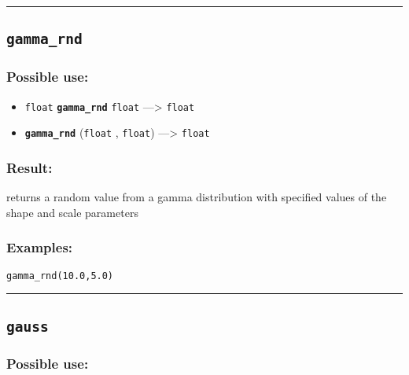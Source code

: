\documentclass[]{book}
\providecommand{\tightlist}{%
  \setlength{\itemsep}{0pt}\setlength{\parskip}{0pt}}
\theoremstyle{definition}
\theoremstyle{definition}
\theoremstyle{definition}
\theoremstyle{remark}
\begin{document}
\begin{center}\rule{0.5\linewidth}{\linethickness}\end{center}

\subsection{\texorpdfstring{\texttt{gamma\_rnd}}{gamma\_rnd}}\label{gamma_rnd}

\subsubsection{Possible use:}\label{possible-use-184}

\begin{itemize}
\tightlist
\item
  \texttt{float} \textbf{\texttt{gamma\_rnd}} \texttt{float}
  ---\textgreater{} \texttt{float}
\item
  \textbf{\texttt{gamma\_rnd}} (\texttt{float} , \texttt{float})
  ---\textgreater{} \texttt{float}
\end{itemize}

\subsubsection{Result:}\label{result-178}

returns a random value from a gamma distribution with specified values
of the shape and scale parameters

\subsubsection{Examples:}\label{examples-134}

\begin{verbatim}
gamma_rnd(10.0,5.0) 
\end{verbatim}

\begin{center}\rule{0.5\linewidth}{\linethickness}\end{center}

\subsection{\texorpdfstring{\texttt{gauss}}{gauss}}\label{gauss}

\subsubsection{Possible use:}\label{possible-use-185}
\end{document}

